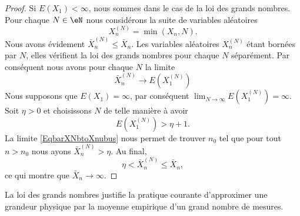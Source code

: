 \begin{proof}
	Si \( E(X_1)<\infty\), nous sommes dans le cas de la loi des grands nombres. Pour chaque \( N\in\eN\) nous considérons la suite de variables aléatoires
	\begin{equation}
		X_n^{(N)}=\min(X_n,N).
	\end{equation}
	Nous avons évidement \( \bar X^{(N)}_n\leq \bar X_n\). Les variables aléatoires \( X^{(N)}_n\) étant bornées par \( N\), elles vérifient la loi des grands nombres pour chaque \( N\) séparément. Par conséquent nous avons pour chaque \( N\) la limite
	\begin{equation}        \label{EqbarXNbtoXnubus}
		\bar X^{(N)}_n\to E(X^{(N)}_1)
	\end{equation}
	Nous supposons que \( E(X_1)=\infty\), par conséquent  \( \lim_{N\to\infty}E(X_1^{(N)})=\infty\). Soit \( \eta>0\) et choisissons \( N\) de telle manière à avoir
	\begin{equation}
		E(X_1^{(N)})>\eta+1.
	\end{equation}
	La limite \eqref{EqbarXNbtoXnubus} nous permet de trouver \( n_0\) tel que pour tout \( n>n_0\) nous ayons \( \bar X^{(N)}_n>\eta\). Au final,
	\begin{equation}
		\eta<\bar X^{(N)}_n\leq \bar X_n,
	\end{equation}
	ce qui montre que \( \bar X_n\to\infty\).
\end{proof}

\begin{example}
	La loi des grands nombres justifie la pratique courante d'approximer une grandeur physique par la moyenne empirique d'un grand nombre de mesures.
\end{example}

